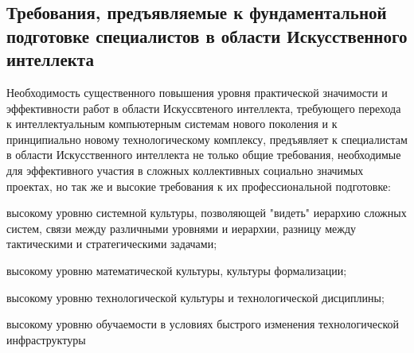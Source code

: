 \subsection*{Требования, предъявляемые к фундаментальной подготовке специалистов в области Искусственного интеллекта}
Необходимость существенного повышения уровня практической значимости и эффективности работ в области Искуссвтеного интеллекта, требующего перехода к интеллектуальным компьютерным системам нового поколения и к принципиально новому технологическому комплексу, предъявляет к специалистам в области Искусственного интеллекта не только общие требования, необходимые для эффективного участия в сложных коллективных социально значимых проектах, но так же и высокие требования к их  профессиональной подготовке:
\begin{textitemize}
	\item высокому уровню системной культуры, позволяющей "видеть"{} иерархию сложных систем, связи между различными уровнями и иерархии, разницу между тактическими и стратегическими задачами;
	\item высокому уровню математической культуры, культуры формализации;
	\item высокому уровню технологической культуры и технологической дисциплины;
	\item высокому уровню обучаемости в условиях быстрого изменения технологической инфраструктуры
\end{textitemize}

